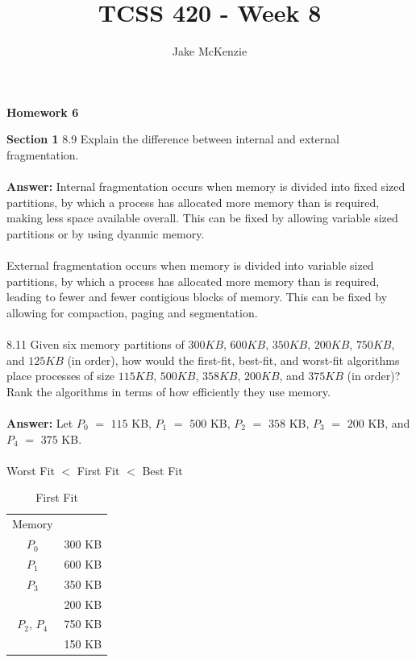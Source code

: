 \documentclass[12pt]{article}
\begin{document}
\title{TCSS 420 - Week 8}
\author{Jake McKenzie}
\maketitle
\noindent\centerline{\textbf{Homework 6}}
\textbf{Section 1}
8.9 Explain the difference between internal and external fragmentation.
\\\\
\textbf{Answer: }Internal fragmentation occurs when memory is divided into fixed sized partitions, by 
which a process has allocated more memory than is required, making less space available 
overall. This can be fixed by allowing variable sized partitions or by using dyanmic memory. 
\\\\
External fragmentation occurs when memory is divided into variable sized partitions, by 
which a process has allocated more memory than is required, leading to fewer and fewer 
contigious blocks of memory. This can be fixed by allowing for compaction, paging and 
segmentation.
\\\\
8.11 Given six memory partitions of $300 KB$, $600 KB$, $350 KB$, $200 KB$, $750 KB$,
and $125 KB$ (in order), how would the first-fit, best-fit, and worst-fit
algorithms place processes of size $115 KB$, $500 KB$, $358 KB$, $200 KB$, and
$375 KB$ (in order)? Rank the algorithms in terms of how efficiently they
use memory.
\\\\
\textbf{Answer: } Let $P_0$ $=$ $115$ KB, $P_1$ $=$ $500$ KB, $P_2$ $=$ $358$ KB, 
$P_3$ $=$ $200$ KB, and $P_4$ $=$ $375$ KB.
\\\\
Worst Fit $<$ First Fit $<$ Best Fit
\\
\begin{table}[htb]
\centering
\caption{First Fit}
\begin{tabular}{|c|c}
\cline{1-1}
Memory      &                               \\ \cline{1-1}
$P_0$       & 300 KB                        \\ \cline{1-1}
$P_1$       & 600 KB                        \\ \cline{1-1}
$P_3$       & 350 KB                        \\ \cline{1-1}
            & 200 KB                        \\ \cline{1-1}
$P_2$, $P_4$       & 750 KB                        \\ \cline{1-1}
            & 150 KB                        \\ \cline{1-1}
\end{tabular}
\end{table}
\end{document}
